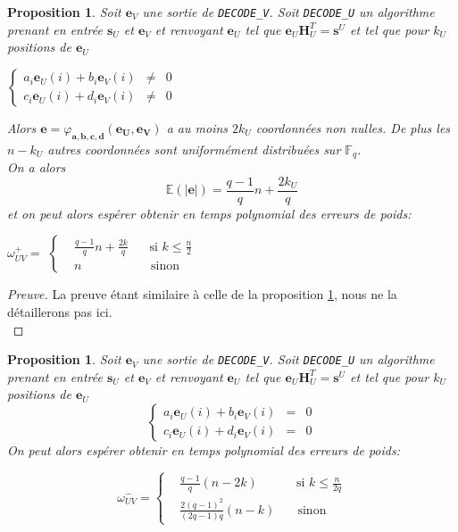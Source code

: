 \documentclass[12pt]{article}
\theoremstyle{plain}
\newtheorem{propo}[thm]{Proposition}
\theoremstyle{definition}
\newcommand{\F}{\mathbb{F}}
\begin{document}
\begin{propo} Soit $\mathbf{e}_V$ une sortie de \verb|DECODE_V|. Soit \verb|DECODE_U| un algorithme prenant en entrée $\mathbf{s}_U$ et $\mathbf{e}_V$ et renvoyant $\mathbf{e}_U$ tel que $\mathbf{e}_U\mathbf{H}_U^T = \mathbf{s}^U$ et tel que pour $k_U$ positions de $\mathbf{e}_U$ 
\begin{center}
$\left \{
\begin{array}{rcl}
a_i\mathbf{e}_U(i) + b_i\mathbf{e}_V(i) &\neq& 0 \\
c_i\mathbf{e}_U(i) + d_i\mathbf{e}_V(i) &\neq& 0
\end{array}
\right.$
\end{center}
Alors $\mathbf{e} = \varphi_{\mathbf{a},\mathbf{b},\mathbf{c},\mathbf{d}}(\mathbf{e_U},\mathbf{e_V})$ a au moins $2k_U$ coordonnées non nulles. De plus les $n-k_U$ autres coordonnées sont uniformément distribuées sur $\F_q$. \\
On a alors 
$$ \mathbb{E}(|\mathbf{e}|) = \frac{q-1}{q}n + \frac{2k_U}{q} $$
et on peut alors espérer obtenir en temps polynomial des erreurs de poids:
\begin{center}
$\omega^+_{UV} = $
$\left \{
\begin{array}{rcl}
&\frac{q-1}{q}n + \frac{2k}{q} & \;\; \text{ si } k \leq \frac{n}{2} \\
&n & \quad \text{sinon}
\end{array}
\right.$
\end{center}
\end{propo}

\begin{proof}[Preuve]
La preuve étant similaire à celle de la proposition \ref{Wuv-}, nous ne la détaillerons pas ici.\\
\end{proof}


\begin{propo}\label{Wuv-} Soit $\mathbf{e}_V$ une sortie de \verb|DECODE_V|. Soit \verb|DECODE_U| un algorithme prenant en entrée $\mathbf{s}_U$ et $\mathbf{e}_V$ et renvoyant $\mathbf{e}_U$ tel que $\mathbf{e}_U\mathbf{H}_U^T = \mathbf{s}^U$ et tel que pour $k_U$ positions de $\mathbf{e}_U$ 
\begin{equation}\label{syst petit poid}
\left \{
\begin{array}{rcl}
a_i\mathbf{e}_U(i) + b_i\mathbf{e}_V(i) &=& 0 \\
c_i\mathbf{e}_U(i) + d_i\mathbf{e}_V(i) &=& 0
\end{array}
\right.
\end{equation}
On peut alors espérer obtenir en temps polynomial des erreurs de poids:
\begin{center}
\begin{equation} 
\omega^-_{UV} = 
\left \{
\begin{array}{rcl}
&\frac{q-1}{q}(n-2k) & \;\; \text{ si } k \leq \frac{n}{2q} \\
&\frac{2(q-1)^2}{(2q-1)q}(n-k) & \quad \text{sinon}
\end{array}
\right.
\end{equation}
\end{center}
\end{propo}
\end{document}
